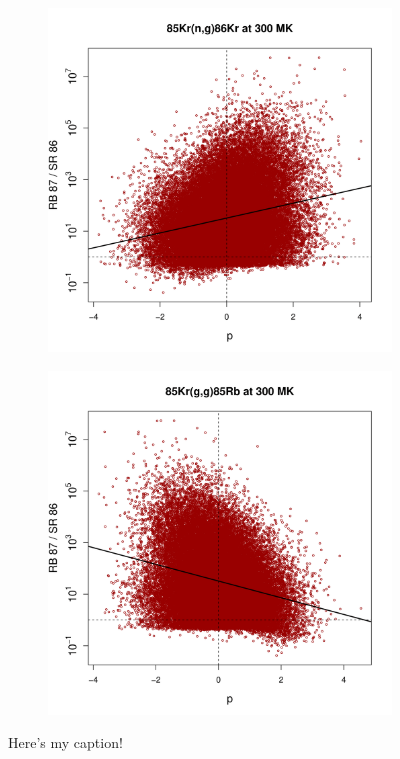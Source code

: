 \begin{figure}[t]
\begin{subfigure}[b]{0.495\textwidth}
        \end{subfigure}
        \begin{subfigure}[b]{0.495\textwidth}   
            \centering 
            \includegraphics[width=\textwidth]{Chapter-3/figs/CorrRB87SR86_85Kr_n_g_86Kr_300MK.png}
        \end{subfigure}
        \hfill
        \begin{subfigure}[b]{0.495\textwidth}   
            \centering 
            \includegraphics[width=\textwidth]{Chapter-3/figs/CorrRB87SR86_85Kr_g_g_85Rb_300MK.png}
        \end{subfigure}
        \caption{\label{}Here's my caption!} 
    \end{figure}

